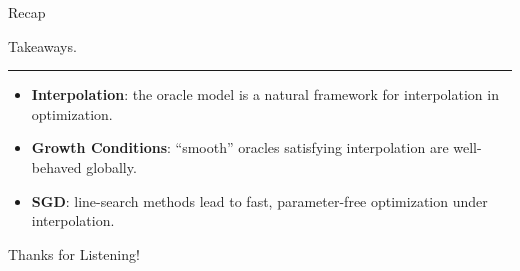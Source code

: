\documentclass[mathserif,notheorems, hyperref={colorlinks, citecolor=blue, urlcolor=blue, linkcolor=blue}]{beamer}
\begin{document}

    \begin{frame}{Recap}
       \Large 
       \begin{center}
         \Huge Takeaways.

         \vspace{-1ex}
         \rule{0.66\textwidth}{1px}
         \vspace{1ex}
       \end{center}

        \begin{itemize}
            \item \textbf{Interpolation}: the oracle model is a natural framework for interpolation in optimization. 

                \vspace{2ex}
            \item \textbf{Growth Conditions}: ``smooth'' oracles satisfying interpolation are well-behaved globally. 

                \vspace{2ex}
            \item \textbf{SGD}: line-search methods lead to fast, parameter-free optimization under interpolation. 
        \end{itemize}
    \end{frame}
    


    \begin{frame}{}
        \begin{center}
        \huge Thanks for Listening!
        \end{center}
    \end{frame}

\end{document}
